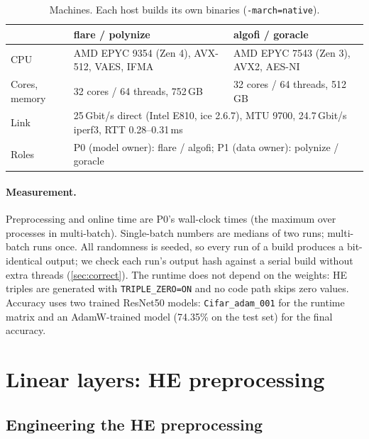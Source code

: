 \documentclass[10pt,a4paper]{article}
\newcommand{\flag}[1]{\nolinkurl{#1}}
\newcommand{\ms}{\,ms\xspace}
\begin{document}
\begin{table}[t]
\centering\small
\begin{tabularx}{\linewidth}{@{}lXX@{}}
\toprule
& flare / polynize & algofi / goracle \\
\midrule
CPU & AMD EPYC 9354 (Zen 4), AVX-512, VAES, IFMA & AMD EPYC 7543 (Zen 3), AVX2, AES-NI \\
Cores, memory & 32 cores / 64 threads, 752\,GB & 32 cores / 64 threads, 512\,GB \\
Link & \multicolumn{2}{l}{25\,Gbit/s direct (Intel E810, ice 2.6.7), MTU 9700, 24.7\,Gbit/s iperf3, RTT 0.28--0.31\ms} \\
Roles & \multicolumn{2}{l}{P0 (model owner): flare / algofi; P1 (data owner): polynize / goracle} \\
\bottomrule
\end{tabularx}
\caption{Machines. Each host builds its own binaries (\texttt{-march=native}).}
\label{tab:machines}
\end{table}

\paragraph{Measurement.} Preprocessing and online time are P0's wall-clock times (the maximum over
processes in multi-batch). Single-batch numbers are medians of two runs; multi-batch runs once.
All randomness is seeded, so every run of a build produces a
bit-identical output; we check each run's output hash against a serial build without extra threads
(\cref{sec:correct}). The runtime does not depend on the weights: HE triples are generated with
\flag{TRIPLE_ZERO=ON} and no code path skips zero values.
Accuracy uses two trained ResNet50 models: \texttt{Cifar\_adam\_001} for the runtime matrix and an
AdamW-trained model (74.35\% on the test set) for the final accuracy.

\section{Linear layers: HE preprocessing}\label{sec:he}



\subsection{Engineering the HE preprocessing}
\end{document}

